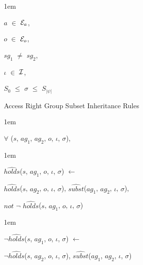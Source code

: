 \documentclass[11pt]{report}
\newenvironment{vquote}
{
  \begin{list}{}{\leftmargin 1em}\item[]
}
{
  \end{list}
}
\begin{document}
\begin{enumerate}
\begin{vquote}
                    \hspace{1em}
                    $a$ $\in$ ${\cal E}_{a}$,

                    \hspace{1em}
                    $o$ $\in$ ${\cal E}_{o}$,

                    \hspace{1em}
                    $sg_1$ $\neq$ $sg_2$,

                    \hspace{1em}
                    $\iota$ $\in$ ${\cal I}$,

                    \hspace{1em}
                    $S_{0}$ $\leq$ $\sigma$ $\leq$ $S_{|\psi|}$
                \end{vquote}

                \item
                  Access Right Group Subset Inheritance Rules

                  \begin{vquote}
                    $\forall$ ($s$, $ag_1$, $ag_2$, $o$, $\iota$, $\sigma$),
                  \end{vquote}

                  \begin{vquote}
                    $\hat{holds}$($s$, $ag_1$, $o$, $\iota$, $\sigma$)
                    $\leftarrow$

                    \hspace{1em}
                    $\hat{holds}$($s$, $ag_2$, $o$, $\iota$, $\sigma$),
                    $\hat{subst}$($ag_1$, $ag_2$, $\iota$, $\sigma$),

                    \hspace{1em}
                    $not$ $\lnot$ $\hat{holds}$($s$, $ag_1$, $o$, $\iota$, $\sigma$)
                  \end{vquote}

                  \begin{vquote}
                    $\lnot\hat{holds}$($s$, $ag_1$, $o$, $\iota$, $\sigma$)
                    $\leftarrow$

                    \hspace{1em}
                    $\lnot\hat{holds}$($s$, $ag_2$, $o$, $\iota$, $\sigma$),
                    $\hat{subst}$($ag_1$, $ag_2$, $\iota$, $\sigma$)
                  \end{vquote}


\end{enumerate}
\end{document}
